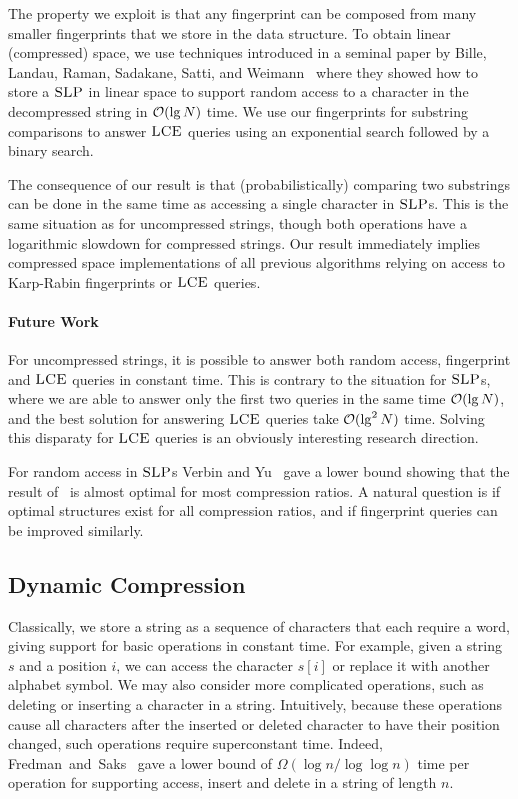 The property we exploit is that any fingerprint can be composed  from many smaller fingerprints that we store in the data structure. 
To obtain linear (compressed) space, we use techniques introduced in a seminal paper by Bille, Landau, Raman, Sadakane, Satti, and Weimann~\cite{bille2011random} where they showed how to store a $\textsc{SLP}$ in linear space to support random access to a character in the decompressed string in $\mathcal{O}(\lg N)$ time. We use our fingerprints for substring comparisons to answer $\textsc{LCE}$ queries using an exponential search followed by a binary search.

The consequence of our result is that (probabilistically) comparing two substrings can be done in the same time as accessing a single character in $\textsc{SLP}$s. This is the same situation as for uncompressed strings, though both operations have a logarithmic slowdown for compressed strings. 
Our result immediately implies compressed space implementations of all previous algorithms relying on access to Karp-Rabin fingerprints or $\textsc{LCE}$ queries. 


\paragraph{Future Work}
For uncompressed strings, it is possible to answer both random access, fingerprint and $\textsc{LCE}$ queries in constant time. This is contrary to the situation for $\textsc{SLP}$s, where we are able to answer only the first two queries in the same time $\mathcal{O}(\lg N)$, and the best solution for answering $\textsc{LCE}$ queries take $\mathcal{O}(\lg^2 N)$ time. Solving this disparaty for $\textsc{LCE}$ queries is an obviously interesting research direction.

For random access in $\textsc{SLP}$s Verbin and Yu~\cite{verbin2013data} gave a lower bound showing that the result of~\cite{bille2011random} is almost optimal for most compression ratios. A natural question is if optimal structures exist for all compression ratios, and if fingerprint queries can be improved similarly.


\subsection{Dynamic Compression}
Classically, we store a string as a sequence of characters that each require a word, giving support for basic operations in constant time. For example, given a string $s$ and a position $i$, we can access the character $s[i]$ or replace it with another alphabet symbol. 
We may also consider more complicated operations, such as deleting or inserting a character in a string. Intuitively, because these operations cause all characters after the inserted or deleted character to have their position changed, such operations require superconstant time. Indeed, Fredman~and~Saks~\cite{fredman1989cell} gave a lower bound of $\Omega(\log n/\log \log n)$ time per operation for supporting access, insert and delete in a string of length $n$.

